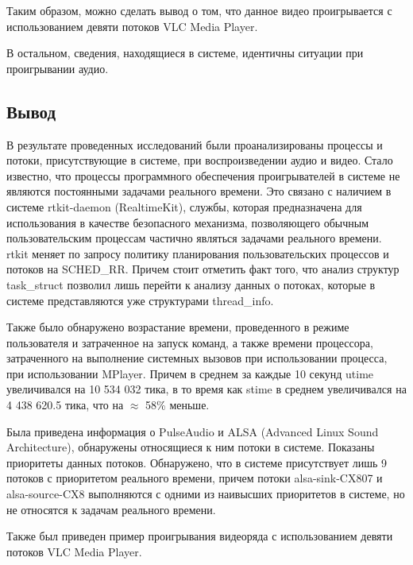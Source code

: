 Таким образом, можно сделать вывод о том, что данное видео проигрывается с использованием девяти потоков VLC Media Player.

В остальном, сведения, находящиеся в системе, идентичны ситуации при проигрывании аудио.

\subsection*{Вывод}
В результате проведенных исследований были проанализированы процессы и потоки, присутствующие в системе, при воспроизведении аудио и видео. Стало известно, что процессы программного обеспечения проигрывателей в системе не являются постоянными задачами реального времени. Это связано с наличием в системе rtkit-daemon (RealtimeKit), службы, которая предназначена для использования в качестве безопасного механизма, позволяющего обычным пользовательским процессам частично являться задачами реального времени. rtkit меняет по запросу политику планирования пользовательских процессов и потоков на SCHED\_RR. Причем стоит отметить факт того, что анализ структур task\_struct позволил лишь перейти к анализу данных о потоках, которые в системе представляются уже структурами thread\_info.

Также было обнаружено возрастание времени, проведенного в режиме пользователя и затраченное на запуск команд, а также времени процессора, затраченного на выполнение системных вызовов при использовании процесса, при использовании MPlayer. Причем в среднем за каждые 10 секунд utime увеличивался на 10 534 032 тика, в то время как stime в среднем увеличивался на 4 438 620.5 тика, что на $\approx$ 58\% меньше.

Была приведена информация о PulseAudio и ALSA (Advanced Linux Sound Architecture), обнаружены относящиеся к ним потоки в системе. Показаны приоритеты данных потоков. Обнаружено, что в системе присутствует лишь 9 потоков с приоритетом реального времени, причем потоки alsa-sink-CX807 и alsa-source-CX8 выполняются с одними из наивысших приоритетов в системе, но не относятся к задачам реального времени.

Также был приведен пример проигрывания видеоряда с использованием девяти потоков VLC Media Player.
